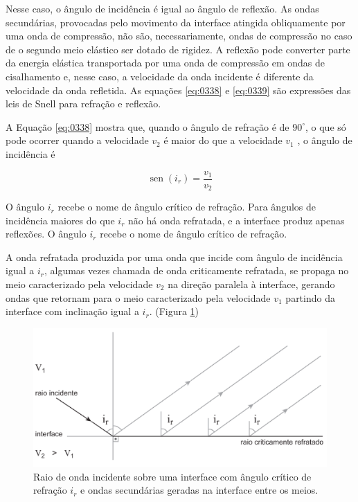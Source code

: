 \documentclass[]{book}
\theoremstyle{definition}
\theoremstyle{definition}
\theoremstyle{definition}
\theoremstyle{remark}
\begin{document}
Nesse caso, o ângulo de incidência é igual ao ângulo de reflexão. As ondas secundárias, provocadas pelo movimento da interface atingida obliquamente por uma onda de compressão, não são, necessariamente, ondas de compressão no caso de o segundo meio elástico ser dotado de rigidez. A reflexão pode converter parte da energia elástica transportada por uma onda de compressão em ondas de cisalhamento e, nesse caso, a velocidade da onda incidente é diferente da velocidade da onda refletida. As equações \eqref{eq:0338} e \eqref{eq:0339} são expressões das leis de Snell para refração e reflexão.

A Equação \eqref{eq:0338} mostra que, quando o ângulo de refração é de \(90^\circ\), o que só pode ocorrer quando a velocidade \(v_2\) é maior do que a velocidade \(v_1\) , o ângulo de incidência é

\begin{equation}
\operatorname{sen}\left(i_{r}\right)=\frac{v_{1}}{v_{2}}  \label{eq:0341}
\end{equation}

O ângulo \(i_r\) recebe o nome de ângulo crítico de refração. Para ângulos de incidência maiores do que \(i_r\) não há onda refratada, e a interface produz apenas reflexões. O ângulo \(i_r\) recebe o nome de ângulo crítico de refração.

A onda refratada produzida por uma onda que incide com ângulo de incidência igual a \(i_r\), algumas vezes chamada de onda criticamente refratada, se propaga no meio caracterizado pela velocidade \(v_2\) na direção paralela à interface, gerando ondas que retornam para o meio caracterizado pela velocidade \(v_1\) partindo da interface com inclinação igual a \(i_r\). (Figura \ref{fig:usp0410})

\begin{figure}

{\centering \includegraphics[width=0.5\linewidth]{fig/figU10} 

}

\caption{Raio de onda incidente sobre uma interface com ângulo crítico de refração $i_r$ e ondas secundárias geradas na interface entre os meios.}\label{fig:usp0410}
\end{figure}
\end{document}
